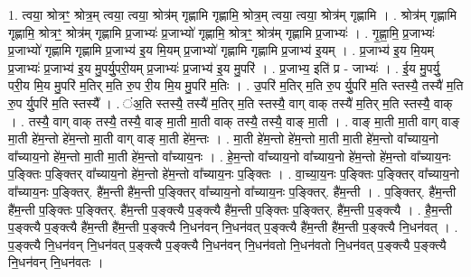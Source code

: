 \documentclass[17pt]{extarticle}
\begin{document}
1. त्वया॒ श्रोत्रꣳ॒॒ श्रोत्र॒म् त्वया॒ त्वया॒ श्रोत्र॑म् गृह्णामि गृह्णामि॒ श्रोत्र॒म् त्वया॒ त्वया॒ श्रोत्र॑म् गृह्णामि । . श्रोत्र॑म् गृह्णामि गृह्णामि॒ श्रोत्रꣳ॒॒ श्रोत्र॑म् गृह्णामि प्र॒जाभ्यः॑ प्र॒जाभ्यो॑ गृह्णामि॒ श्रोत्रꣳ॒॒ श्रोत्र॑म् गृह्णामि प्र॒जाभ्यः॑ । . गृ॒ह्णा॒मि॒ प्र॒जाभ्यः॑ प्र॒जाभ्यो॑ गृह्णामि गृह्णामि प्र॒जाभ्य॑ इ॒य मि॒यम् प्र॒जाभ्यो॑ गृह्णामि गृह्णामि प्र॒जाभ्य॑ इ॒यम् । . प्र॒जाभ्य॑ इ॒य मि॒यम् प्र॒जाभ्यः॑ प्र॒जाभ्य॑ इ॒य मु॒पर्यु॒परी॒यम् प्र॒जाभ्यः॑ प्र॒जाभ्य॑ इ॒य मु॒परि॑ । . प्र॒जाभ्य॒ इति॑ प्र - जाभ्यः॑ । . ई॒य मु॒पर्यु॒ परी॒य मि॒य मु॒परि॑ म॒तिर् म॒ति रु॒प री॒य मि॒य मु॒परि॑ म॒तिः । . उ॒परि॑ म॒तिर् म॒ति रु॒प र्यु॒परि॑ म॒ति स्तस्यै॒ तस्यै॑ म॒ति रु॒प र्यु॒परि॑ म॒ति स्तस्यै᳚ । . ंअ॒ति स्तस्यै॒ तस्यै॑ म॒तिर् म॒ति स्तस्यै॒ वाग् वाक् तस्यै॑ म॒तिर् म॒ति स्तस्यै॒ वाक् । . तस्यै॒ वाग् वाक् तस्यै॒ तस्यै॒ वाङ् मा॒ती मा॒ती वाक् तस्यै॒ तस्यै॒ वाङ् मा॒ती । . वाङ् मा॒ती मा॒ती वाग् वाङ् मा॒ती हे॑म॒न्तो हे॑म॒न्तो मा॒ती वाग् वाङ् मा॒ती हे॑म॒न्तः । . मा॒ती हे॑म॒न्तो हे॑म॒न्तो मा॒ती मा॒ती हे॑म॒न्तो वा᳚च्याय॒नो वा᳚च्याय॒नो हे॑म॒न्तो मा॒ती मा॒ती हे॑म॒न्तो वा᳚च्याय॒नः । . हे॒म॒न्तो वा᳚च्याय॒नो वा᳚च्याय॒नो हे॑म॒न्तो हे॑म॒न्तो वा᳚च्याय॒नः प॒ङ्क्तिः प॒ङ्क्तिर् वा᳚च्याय॒नो हे॑म॒न्तो हे॑म॒न्तो वा᳚च्याय॒नः प॒ङ्क्तिः । . वा॒च्या॒य॒नः प॒ङ्क्तिः प॒ङ्क्तिर् वा᳚च्याय॒नो वा᳚च्याय॒नः प॒ङ्क्तिर्. है॑म॒न्ती है॑म॒न्ती प॒ङ्क्तिर् वा᳚च्याय॒नो वा᳚च्याय॒नः प॒ङ्क्तिर्. है॑म॒न्ती । . प॒ङ्क्तिर्. है॑म॒न्ती है॑म॒न्ती प॒ङ्क्तिः प॒ङ्क्तिर्. है॑म॒न्ती प॒ङ्क्त्यै प॒ङ्क्त्यै है॑म॒न्ती प॒ङ्क्तिः प॒ङ्क्तिर्. है॑म॒न्ती प॒ङ्क्त्यै । . है॒म॒न्ती प॒ङ्क्त्यै प॒ङ्क्त्यै है॑म॒न्ती है॑म॒न्ती प॒ङ्क्त्यै नि॒धन॑वन् नि॒धन॑वत् प॒ङ्क्त्यै है॑म॒न्ती है॑म॒न्ती प॒ङ्क्त्यै नि॒धन॑वत् । . प॒ङ्क्त्यै नि॒धन॑वन् नि॒धन॑वत् प॒ङ्क्त्यै प॒ङ्क्त्यै नि॒धन॑वन् नि॒धन॑वतो नि॒धन॑वतो नि॒धन॑वत् प॒ङ्क्त्यै प॒ङ्क्त्यै नि॒धन॑वन् नि॒धन॑वतः । \newline
\end{document}
